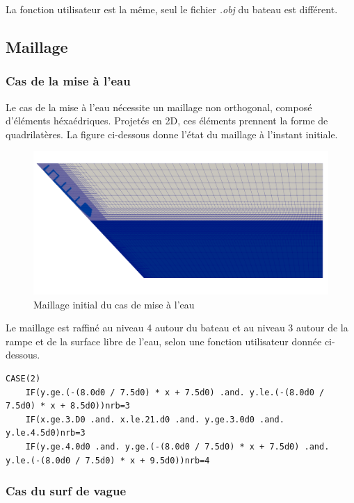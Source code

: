 \documentclass[../main.tex]{subfiles}
\begin{document}
La fonction utilisateur est la même, seul le fichier \textit{.obj} du bateau est différent.

\subsection{Maillage}

\subsubsection{Cas de la mise à l'eau}

Le cas de la mise à l'eau nécessite un maillage non orthogonal, composé d'éléments héxaédriques. Projetés en 2D, ces éléments prennent la forme de quadrilatères. La figure ci-dessous donne l'état du maillage à l'instant initiale.

\begin{figure}[H]
    \centering
    \includegraphics[width=12cm]{IMAGES/part1/mesh_zephyr_lanching.png}
    \caption{Maillage initial du cas de mise à l'eau}
\end{figure}

Le maillage est raffiné au niveau 4 autour du bateau et au niveau 3 autour de la rampe et de la surface libre de l'eau, selon une fonction utilisateur donnée ci-dessous.
\begin{lstlisting}[style=f90, caption={Maillge utilisateur pour le cas de la mise à l'eau}, captionpos=b]
    CASE(2)
    IF(y.ge.(-(8.0d0 / 7.5d0) * x + 7.5d0) .and. y.le.(-(8.0d0 / 7.5d0) * x + 8.5d0))nrb=3
    IF(x.ge.3.D0 .and. x.le.21.d0 .and. y.ge.3.0d0 .and. y.le.4.5d0)nrb=3
    IF(y.ge.4.0d0 .and. y.ge.(-(8.0d0 / 7.5d0) * x + 7.5d0) .and. y.le.(-(8.0d0 / 7.5d0) * x + 9.5d0))nrb=4
\end{lstlisting}


\subsubsection{Cas du surf de vague}
\end{document}
